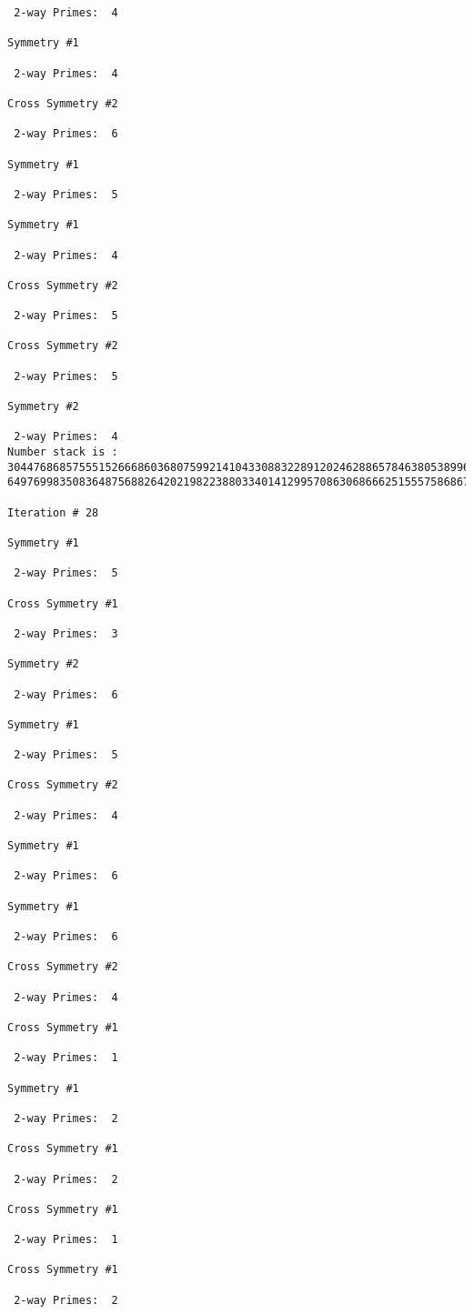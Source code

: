 {{{{\begin{verbatim}
 2-way Primes: 	4

Symmetry #1

 2-way Primes: 	4

Cross Symmetry #2

 2-way Primes: 	6

Symmetry #1

 2-way Primes: 	5

Symmetry #1

 2-way Primes: 	4

Cross Symmetry #2

 2-way Primes: 	5

Cross Symmetry #2

 2-way Primes: 	5

Symmetry #2

 2-way Primes: 	4
Number stack is :
30447686857555152666860368075992141043308832289120246288657846380538996794608835958544046240163340857
64976998350836487568826420219822388033401412995708630686662515557586867440375804336104264044585953880

Iteration #	28

Symmetry #1

 2-way Primes: 	5

Cross Symmetry #1

 2-way Primes: 	3

Symmetry #2

 2-way Primes: 	6

Symmetry #1

 2-way Primes: 	5

Cross Symmetry #2

 2-way Primes: 	4

Symmetry #1

 2-way Primes: 	6

Symmetry #1

 2-way Primes: 	6

Cross Symmetry #2

 2-way Primes: 	4

Cross Symmetry #1

 2-way Primes: 	1

Symmetry #1

 2-way Primes: 	2

Cross Symmetry #1

 2-way Primes: 	2

Cross Symmetry #1

 2-way Primes: 	1

Cross Symmetry #1

 2-way Primes: 	2


\end{verbatim}}}}}
